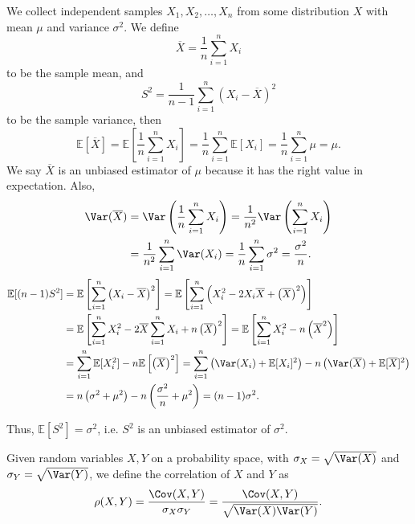 \begin{eg}
    We collect independent samples \(X_1, X_2, \dots , X_n\) from some distribution \(X\) with mean \(\mu \) and variance \(\sigma ^2\). We define
    \[
        \overline{X} = \frac{1}{n} \sum_{i=1}^n X_i
    \]
    to be the sample mean, and
    \[
        S^2 = \frac{1}{n - 1} \sum_{i=1}^n \left( X_i - \overline{X} \right)^2 
    \]
    to be the sample variance, then 
    \[
        \mathbb{E} \left[ \overline{X} \right]  = \mathbb{E} \left[ \frac{1}{n} \sum_{i=1}^n X_i  \right] = \frac{1}{n} \sum_{i=1}^n \mathbb{E} [X_i] = \frac{1}{n} \sum_{i=1}^n \mu = \mu.   
    \]    
    We say \(\overline{X} \) is an unbiased estimator of \(\mu\) because it has the right value in expectation. Also,
    \begin{align*}
        \Var(\overline{X}) &= \Var \left( \frac{1}{n} \sum_{i=1}^n X_i  \right) = \frac{1}{n^2} \Var \left( \sum_{i=1}^n X_i  \right) \\
        &= \frac{1}{n^2} \sum_{i=1}^n \Var(X_i) = \frac{1}{n} \sum_{i=1}^n \sigma ^2 = \frac{\sigma ^2}{n}.    
    \end{align*}
    \begin{align*}
        \mathbb{E} [(n - 1) S^2] &= \mathbb{E} \left[ \sum_{i=1}^n \left( X_i - \overline{X} \right)^2   \right] = \mathbb{E} \left[ \sum_{i=1}^n \left( X_i^2 - 2 X_i \overline{X} + \left( \overline{X}  \right)^2    \right)   \right]  \\
        &= \mathbb{E} \left[ \sum_{i=1}^n X_i^2 - 2 \overline{X} \sum_{i=1}^n X_i + n \left( \overline{X} \right)^2     \right] = \mathbb{E} \left[ \sum_{i=1}^n X_i^2 - n \left( \overline{X}^2 \right)   \right] \\
        &= \sum_{i=1}^n \mathbb{E} [X_i^2] - n \mathbb{E} \left[ \left( \overline{X}  \right)^2  \right] = \sum_{i=1}^n \left( \Var(X_i) + \mathbb{E} [X_i]^2 \right) - n \left( \Var(\overline{X}) + \mathbb{E} [\overline{X}]^2 \right) \\
        &= n \left( \sigma ^2 + \mu ^2 \right) - n \left( \frac{\sigma ^2}{n} + \mu ^2 \right) = (n - 1) \sigma ^2.         
    \end{align*}

    Thus, \(\mathbb{E} [S^2] = \sigma ^2\), i.e. \(S^2\) is an unbiased estimator of \(\sigma ^2\).    
\end{eg}

\begin{definition}
    Given random variables \(X, Y\) on a probability space, with \(\sigma _X = \sqrt{\Var(X)} \) and \(\sigma _Y = \sqrt{\Var(Y)} \), we define the correlation of \(X\) and \(Y\) as 
    \[
        \rho (X, Y) = \frac{\Cov(X, Y)}{\sigma _X \sigma _Y} = \frac{\Cov(X, Y)}{\sqrt{\Var(X) \Var(Y)} }.
    \]     
\end{definition}

